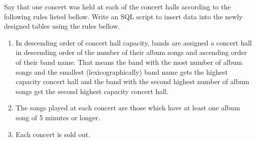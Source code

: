 \documentclass[12pt]{scrartcl}
\begin{document}
Say that one concert was held at each of the concert halls 
according to the following rules listed bellow. Write an SQL 
script to insert data into the newly designed tables using the 
rules bellow.

\begin{enumerate}
  \item In descending order of concert hall capacity, bands are 
    assigned a concert hall in descending order of the number of 
    their album songs and ascending order of their band name. That 
    means the band with the most number of album songs and the 
    smallest (lexicographically) band name gets the highest capacity 
    concert hall and the band with the second highest number of album 
    songs get the second highest capacity concert hall.
  \item The songs played at each concert are those which have at least 
    one album song of 5 minutes or longer.
  \item Each concert is sold out.
\end{enumerate}
\end{document}
